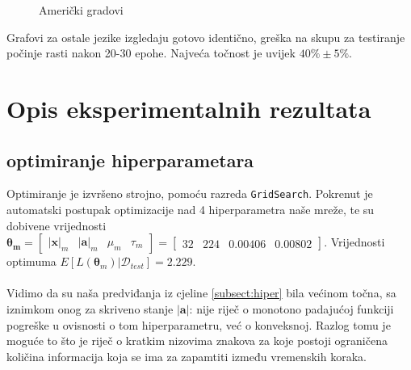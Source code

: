 \documentclass[conference]{IEEEtran}
\begin{document}
\begin{figure}[H]
\centering
{}
\caption{Američki gradovi}
\end{figure}
Grafovi za ostale jezike izgledaju gotovo identično, greška na skupu za testiranje počinje rasti nakon 20-30 epohe. Najveća točnost je uvijek $40\% \pm 5\%$.

\section{Opis eksperimentalnih rezultata} 
\subsection{optimiranje hiperparametara}
Optimiranje je izvršeno strojno, pomoću razreda \texttt{GridSearch}.
Pokrenut je automatski postupak optimizacije nad 4 hiperparametra naše mreže, te su dobivene vrijednosti $\mathbf{\boldsymbol{\theta}_m} = \begin{bmatrix} \lvert \mathbf{x} \rvert_m & \lvert \mathbf{a} \rvert_m & \mu_m & \tau_m \end{bmatrix} = \begin{bmatrix} 32 & 224 & 0.00406 & 0.00802 \end{bmatrix}$.
Vrijednosti optimuma $E[L(\mathbf{\boldsymbol{\theta}}_m) | \mathcal{D}_{test}] = 2.229$.\\
\\
Vidimo da su naša predviđanja iz cjeline \ref{subsect:hiper} bila većinom točna, sa iznimkom onog za skriveno stanje $\lvert \mathbf{a} \rvert$: nije riječ o monotono padajućoj funkciji pogreške u ovisnosti o tom hiperparametru, već o konveksnoj. Razlog tomu je moguće to što je riječ o kratkim nizovima znakova za koje postoji ograničena količina informacija koja se ima za zapamtiti između vremenskih koraka.
\end{document}
